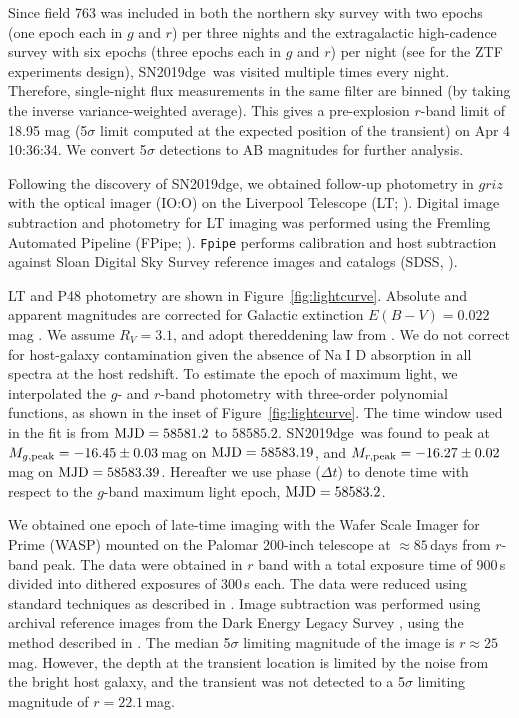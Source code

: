 \documentclass[twocolumn]{aastex63}
\newcommand{\name}{SN2019dge}
\def\ion#1#2{#1$\;${\footnotesize\rm{#2}}\relax}
\begin{document}
\begin{CJK*}{UTF8}{gbsn}
Since field 763 was included in both the northern sky survey with two epochs (one epoch each in $g$ 
and $r$) per three nights and the extragalactic high-cadence survey with six epochs (three epochs 
each in $g$ and $r$) per night (see \citealt{Bellm2019a} for the ZTF experiments design), \name\ was 
visited multiple times every night. Therefore, single-night flux measurements in the same 
filter are binned (by taking the inverse variance-weighted average). This gives a pre-explosion 
$r$-band limit of 18.95 mag (5$\sigma$ limit computed at the expected position of the transient) on 
Apr 4 10:36:34. We convert 5$\sigma$ detections to AB magnitudes for further analysis.

Following the discovery of \name, we obtained follow-up photometry in $griz$ with the optical 
imager (IO:O) on the Liverpool Telescope (LT; \citealt{Steele2004}). Digital image subtraction and 
photometry for LT imaging was performed using the Fremling Automated Pipeline ({FPipe}; 
\citealt{Fremling2016}). \texttt{Fpipe} performs calibration and host subtraction against Sloan Digital 
Sky Survey reference images and catalogs (SDSS, \citealt{Alam2015}).

LT and P48 photometry are shown in Figure~\ref{fig:lightcurve}. Absolute and apparent magnitudes are 
corrected for Galactic extinction $E(B-V)=0.022$\,mag \citep{Schlafly2011}. We assume $R_V=3.1$, 
and adopt thereddening law from \citet{Cardelli1989}. We do not correct for host-galaxy contamination 
given the absence of \ion{Na}{I} D absorption in all spectra at the host redshift. To estimate the epoch 
of maximum light, we interpolated the $g$- and $r$-band photometry with 
three-order polynomial functions, as shown in the inset of Figure~\ref{fig:lightcurve}. The time 
window used in the fit is from ${\rm MJD}=58581.2$ to $58585.2$. \name\ was found to peak 
at $M_{g\rm , peak}=-16.45\pm0.03$\,mag on ${\rm MJD}=58583.19$, and $M_{r \rm ,peak } 
=-16.27\pm0.02$\,mag on ${\rm MJD}=58583.39$. Hereafter we use phase ($\Delta t$) to denote time
with respect to the $g$-band maximum light epoch, ${\rm MJD}=58583.2$.

We obtained one epoch of late-time imaging with the Wafer Scale Imager for Prime (WASP) mounted 
on the Palomar 200-inch telescope at $\approx 85$\,days from $r$-band peak. The data were obtained 
in $r$ band with a total exposure time of 900\,s divided into dithered exposures of 300\,s each. The 
data were reduced using standard techniques as described in \citet{De2020a}. Image subtraction was 
performed using archival reference images from the Dark Energy Legacy Survey \citep{Dey2019}, using 
the method described in \citet{De2020b}. The median 5$\sigma$ limiting magnitude of the image is $r 
\approx 25$\,mag. However, the depth at the transient location is limited by the noise from the bright 
host galaxy, and the transient was not detected to a 5$\sigma$ limiting magnitude of $r = 22.1$\,mag. 


\end{CJK*}
\end{document}
